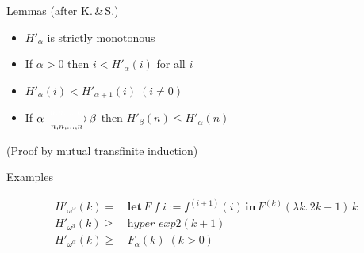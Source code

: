 \documentclass[10pt, fleqn]{beamer}
\begin{document}
\begin{frame}[fragile, label={fgflemmas}]

\begin{block}{Lemmas (after K.\,\&\,S.)}
   \begin{itemize} 
    \item \textcolor{mathcolor}{$H'_\alpha$} is strictly monotonous
    
     \item  If $\alpha>0$ then \textcolor{mathcolor}{$ i < H'_\alpha(i)$} for all $i$
    
    \item   $H'_\alpha(i) < H'_{\alpha+1}(i) \; (i \not=0)$
    
       \item     If \textcolor{mathcolor}{$\alpha \rplus{n,n,\dots,n} \beta$} then \textcolor{mathcolor}{$H'_\beta(n)\leq H'_\alpha(n)$} 
         

       \end{itemize}
       (Proof by mutual transfinite induction)
 \end{block}  

 \begin{block}{Examples}
         
      {\color{mathcolor}
      
        \begin{align*}
        H'_{\omega^\omega}(k)=\,& \textbf{let}\,F\;f\;i := f^{(i+1)}(i)\,
                                  \textbf{in}\, F^{(k)}(\lambda k.\,2k+1)\,k\\
      H'_{\omega^3}(k) \geq\, & \textit{hyper\_exp2}(k+1) \\
      H'_{\omega^\alpha}(k)\geq\,& F_\alpha(k)\; (k>0)\\
    \end{align*}
       }%
  \end{block}
  
    
\end{frame}
 



\end{document}
